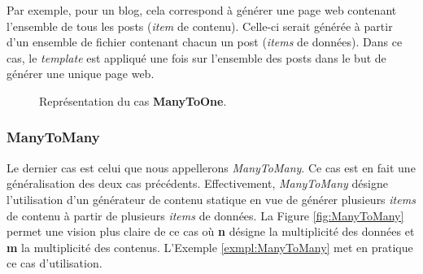 			\begin{exmpl}
				\label{exmpl:ManyToOne}
				Par exemple, pour un blog, cela correspond à générer une page web contenant l'ensemble de tous les posts (\textit{item} de contenu). Celle-ci serait générée à partir d'un ensemble de fichier contenant chacun un post (\textit{items} de données). Dans ce cas, le \textit{template} est appliqué une  fois sur l'ensemble des posts dans le but de générer une unique page web.
			\end{exmpl}
		
			\begin{figure}[!]
				\begin{center}
					\caption{Représentation du cas \textbf{ManyToOne}.}
					\label{fig:ManyToOne}
				\end{center}
			\end{figure}
			
		\subsubsection*{ManyToMany}
			
			Le dernier cas est celui que nous appellerons \textit{ManyToMany}. Ce cas est en fait une généralisation des deux cas précédents. Effectivement, \textit{ManyToMany} désigne l'utilisation d'un générateur de contenu statique en vue de générer plusieurs \textit{items} de contenu à partir de plusieurs \textit{items} de données. La Figure \ref{fig:ManyToMany} permet une vision plus claire de ce cas où \textbf{n} désigne la multiplicité des données et \textbf{m} la multiplicité des contenus. L'Exemple \ref{exmpl:ManyToMany} met en pratique ce cas d'utilisation.\\
			
